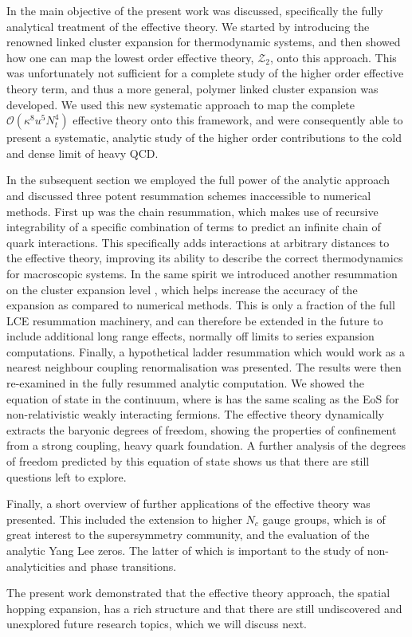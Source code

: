 In  the main objective of the present work was discussed,
specifically the fully analytical treatment of the effective theory. We started
by introducing the renowned linked cluster expansion for thermodynamic systems,
and then showed how one can map the lowest order effective theory,
$\mathcal{Z}_2$, onto this approach. This was unfortunately not sufficient for a
complete study of the higher order effective theory term, and thus a more
general, polymer linked cluster expansion was developed. We used this new
systematic approach to map the complete $\mathcal{O}(\kappa^8 u^5 N_t^4)$
effective theory onto this framework, and were consequently able to present a
systematic, analytic study of the higher order contributions to the cold and
dense limit of heavy QCD.

In the subsequent section we employed the full power of the analytic approach
and discussed three potent resummation schemes inaccessible to numerical
methods.  First up was the chain resummation, which makes use of recursive
integrability of a specific combination of terms to predict an infinite chain of
quark interactions. This specifically adds interactions at arbitrary distances
to the effective theory, improving its ability to describe the correct
thermodynamics for macroscopic systems. In the same spirit we introduced another
resummation on the cluster expansion level , which helps increase the accuracy
of the expansion as compared to numerical methods. This is only a fraction of
the full LCE resummation machinery, and can therefore be extended in the future
to include additional long range effects, normally off limits to series
expansion computations. Finally, a hypothetical ladder resummation which would
work as a nearest neighbour coupling renormalisation was presented. The results
were then re-examined in the fully resummed analytic computation. We showed the
equation of state in the continuum, where is has the same scaling as the EoS for
non-relativistic weakly interacting fermions. The effective theory dynamically
extracts the baryonic degrees of freedom, showing the properties of confinement
from a strong coupling, heavy quark foundation. A further analysis of the
degrees of freedom predicted by this equation of state shows us that there are
still questions left to explore.

Finally, a short overview of further applications of the effective theory was
presented. This included the extension to higher $N_c$ gauge groups, which is of
great interest to the supersymmetry community, and the evaluation of the
analytic Yang Lee zeros. The latter of which is important to the study of
non-analyticities and phase transitions.

The present work demonstrated that the effective theory approach, the spatial
hopping expansion, has a rich structure and that there are still undiscovered
and unexplored future research topics, which we will discuss next.
